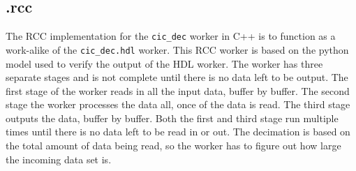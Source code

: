 \subsection*{\comp.rcc}
\begin{flushleft}
	The RCC implementation for the \verb+cic_dec+ worker in C++ is to function as a work-alike of the \verb+cic_dec.hdl+ worker. This RCC worker is based on the python model used to verify the output of the HDL worker. The worker has three separate stages and is not complete until there is no data left to be output. The first stage of the worker reads in all the input data, buffer by buffer. The second stage the worker processes the data all, once of the data is read. The third stage outputs the data, buffer by buffer. Both the first and third stage run multiple times until there is no data left to be read in or out.  The decimation is based on the total amount of data being read, so the worker has to figure out how large the incoming data set is.
\end{flushleft}
